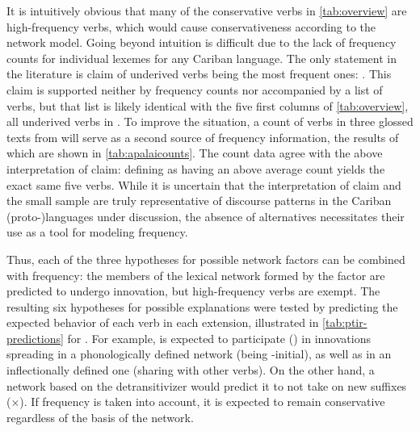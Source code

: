 It is intuitively obvious that many of the conservative verbs in \cref{tab:overview} are high-frequency verbs, which would cause conservativeness according to the network model.
Going beyond intuition is difficult due to the lack of frequency counts for individual lexemes for any Cariban language.
The only statement in the literature is  claim of \kalina underived  verbs being the most frequent ones: .
This claim is supported neither by frequency counts nor accompanied by a list of verbs, but that list is likely identical with the five first columns of \cref{tab:overview}, all underived  verbs in \kalina.
To improve the situation, a count of  verbs in three glossed \apalai texts from \textcite{koehns1994textos} will serve as a second source of frequency information, the results of which are shown in \cref{tab:apalaicounts}.
The count data agree with the above interpretation of  claim: defining  as having an above average count yields the exact same five verbs.
While it is uncertain that the interpretation of  claim and the small \apalai sample are truly representative of discourse patterns in the Cariban (proto-)languages under discussion, the absence of alternatives necessitates their use as a tool for modeling frequency.




Thus, each of the three hypotheses for possible network factors can be combined with frequency: the members of the lexical network formed by the factor are predicted to undergo innovation, but high-frequency verbs are exempt.
The resulting six hypotheses for possible explanations were tested by predicting the expected behavior of each verb in each extension, illustrated in \cref{tab:ptir-predictions} for \PTir.
For example,   is expected to participate (\checkmark) in innovations spreading in a phonologically defined network (being -initial), as well as in an inflectionally defined one (sharing  with other  verbs).
On the other hand, a network based on the detransitivizer would predict it to not take on new suffixes (×).
If frequency is taken into account, it is expected to remain conservative regardless of the basis of the network.

